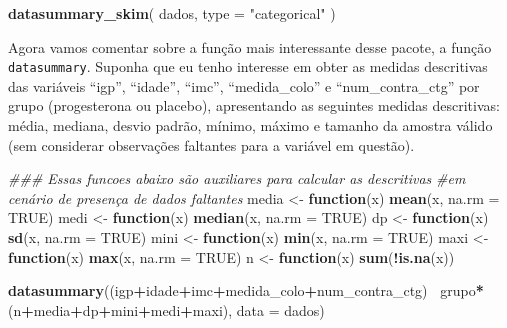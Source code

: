 \documentclass[
]{book}
\newenvironment{Shaded}{\begin{snugshade}}{\end{snugshade}}
\newcommand{\CommentTok}[1]{\textcolor[rgb]{0.56,0.35,0.01}{\textit{#1}}}
\newcommand{\ControlFlowTok}[1]{\textcolor[rgb]{0.13,0.29,0.53}{\textbf{#1}}}
\newcommand{\DataTypeTok}[1]{\textcolor[rgb]{0.13,0.29,0.53}{#1}}
\newcommand{\KeywordTok}[1]{\textcolor[rgb]{0.13,0.29,0.53}{\textbf{#1}}}
\newcommand{\NormalTok}[1]{#1}
\newcommand{\OperatorTok}[1]{\textcolor[rgb]{0.81,0.36,0.00}{\textbf{#1}}}
\newcommand{\OtherTok}[1]{\textcolor[rgb]{0.56,0.35,0.01}{#1}}
\newcommand{\StringTok}[1]{\textcolor[rgb]{0.31,0.60,0.02}{#1}}
\begin{document}
\begin{Shaded}
\begin{Highlighting}[]
\KeywordTok{datasummary_skim}\NormalTok{(}
\NormalTok{  dados,}
  \DataTypeTok{type =} \StringTok{"categorical"}
\NormalTok{)}
\end{Highlighting}
\end{Shaded}

Agora vamos comentar sobre a função mais interessante desse pacote, a função \texttt{datasummary}. Suponha que eu tenho interesse em obter as medidas descritivas das variáveis ``igp'', ``idade'', ``imc'', ``medida\_colo'' e ``num\_contra\_ctg'' por grupo (progesterona ou placebo), apresentando as seguintes medidas descritivas: média, mediana, desvio padrão, mínimo, máximo e tamanho da amostra válido (sem considerar observações faltantes para a variável em questão).

\begin{Shaded}
\begin{Highlighting}[]
\CommentTok{### Essas funcoes abaixo são auxiliares para calcular as descritivas}
\CommentTok{#em cenário de presença de dados faltantes}
\NormalTok{media <-}\StringTok{ }\ControlFlowTok{function}\NormalTok{(x) }\KeywordTok{mean}\NormalTok{(x, }\DataTypeTok{na.rm =} \OtherTok{TRUE}\NormalTok{)}
\NormalTok{medi <-}\StringTok{ }\ControlFlowTok{function}\NormalTok{(x) }\KeywordTok{median}\NormalTok{(x, }\DataTypeTok{na.rm =} \OtherTok{TRUE}\NormalTok{)}
\NormalTok{dp <-}\StringTok{ }\ControlFlowTok{function}\NormalTok{(x) }\KeywordTok{sd}\NormalTok{(x, }\DataTypeTok{na.rm =} \OtherTok{TRUE}\NormalTok{)}
\NormalTok{mini <-}\StringTok{ }\ControlFlowTok{function}\NormalTok{(x) }\KeywordTok{min}\NormalTok{(x, }\DataTypeTok{na.rm =} \OtherTok{TRUE}\NormalTok{)}
\NormalTok{maxi <-}\StringTok{ }\ControlFlowTok{function}\NormalTok{(x) }\KeywordTok{max}\NormalTok{(x, }\DataTypeTok{na.rm =} \OtherTok{TRUE}\NormalTok{)}
\NormalTok{n <-}\StringTok{ }\ControlFlowTok{function}\NormalTok{(x) }\KeywordTok{sum}\NormalTok{(}\OperatorTok{!}\KeywordTok{is.na}\NormalTok{(x))}
\end{Highlighting}
\end{Shaded}

\begin{Shaded}
\begin{Highlighting}[]
\KeywordTok{datasummary}\NormalTok{((igp}\OperatorTok{+}\NormalTok{idade}\OperatorTok{+}\NormalTok{imc}\OperatorTok{+}\NormalTok{medida_colo}\OperatorTok{+}\NormalTok{num_contra_ctg)}\OperatorTok{~}
\StringTok{              }\NormalTok{grupo}\OperatorTok{*}\NormalTok{(n}\OperatorTok{+}\NormalTok{media}\OperatorTok{+}\NormalTok{dp}\OperatorTok{+}\NormalTok{mini}\OperatorTok{+}\NormalTok{medi}\OperatorTok{+}\NormalTok{maxi), }\DataTypeTok{data =}\NormalTok{ dados)}
\end{Highlighting}
\end{Shaded}
\end{document}
